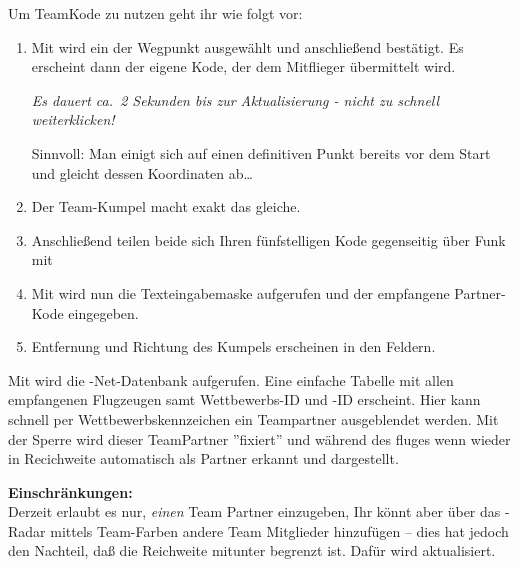 Um TeamKode zu nutzen geht ihr wie folgt vor:
\begin{enumerate}
\item Mit  wird ein der Wegpunkt ausgewählt und anschließend bestätigt.
Es erscheint dann der eigene Kode, der dem Mitflieger übermittelt wird. 

\achtung \textsl{Es dauert ca.\ 2 Sekunden bis zur Aktualisierung - nicht zu schnell weiterklicken!}

Sinnvoll: 
Man einigt sich auf einen definitiven Punkt bereits vor dem Start und gleicht dessen Koordinaten ab\dots
\item Der Team-Kumpel macht exakt das gleiche.
\item Anschließend teilen beide sich Ihren fünfstelligen Kode gegenseitig über Funk mit
\item Mit  wird nun die Texteingabemaske aufgerufen und der empfangene Partner-Kode eingegeben.
\item Entfernung und Richtung des Kumpels erscheinen in den Feldern.
\end{enumerate}
Mit   wird die \fl-Net-Datenbank aufgerufen.
Eine einfache  Tabelle  mit allen empfangenen Flugzeugen samt Wettbewerbs-ID und \fl-ID erscheint.
Hier kann schnell per Wettbewerbskennzeichen ein Teampartner ausgeblendet  werden.
Mit der Sperre wird dieser TeamPartner ''fixiert'' und während des fluges wenn wieder in Recichweite automatisch als Partner erkannt und dargestellt.

\textbf{Einschränkungen:}\\
Derzeit erlaubt  es \xc nur, \textsl{einen} Team Partner einzugeben, Ihr könnt aber über
das \fl-Radar mittels Team-Farben andere Team Mitglieder hinzufügen -- dies hat jedoch den Nachteil,
daß die Reichweite mitunter begrenzt ist. Dafür wird aktualisiert.
